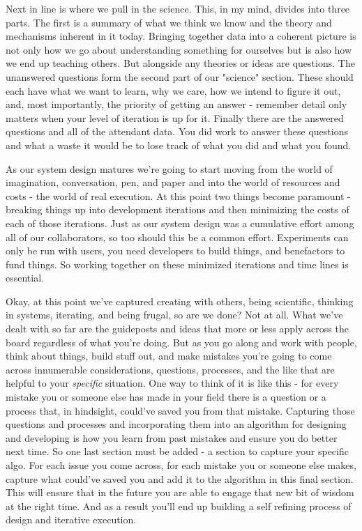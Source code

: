 \documentclass[11pt]{book}
\begin{document}
Next in line is where we pull in the science. This, in my mind, divides into three parts. The first is a summary of what we think we know and the theory and mechanisms inherent in it today. Bringing together data into a coherent picture is not only how we go about understanding something for ourselves but is also how we end up teaching others. But alongside any theories or ideas are questions. The unanswered questions form the second part of our "science" section. These should each have what we want to learn, why we care, how we intend to figure it out, and, most importantly, the priority of getting an answer - remember detail only matters when your level of iteration is up for it. Finally there are the answered questions and all of the attendant data. You did work to answer these questions and what a waste it would be to lose track of what you did and what you found.
\newline

As our system design matures we're going to start moving from the world of imagination, conversation, pen, and paper and into the world of resources and costs - the world of real execution. At this point two things become paramount - breaking things up into development iterations and then minimizing the costs of each of those iterations. Just as our system design was a cumulative effort among all of our collaborators, so too should this be a common effort. Experiments can only be run with users, you need developers to build things, and benefactors to fund things. So working together on these minimized iterations and time lines is essential.
\newline

Okay, at this point we've captured creating with others, being scientific, thinking in systems, iterating, and being frugal, so are we done? Not at all. What we've dealt with so far are the guideposts and ideas that more or less apply across the board regardless of what you're doing. But as you go along and work with people, think about things, build stuff out, and make mistakes you're going to come across innumerable considerations, questions, processes, and the like that are helpful to your \textit{specific} situation. One way to think of it is like this - for every mistake you or someone else has made in your field there is a question or a process that, in hindsight, could've saved you from that mistake. Capturing those questions and processes and incorporating them into an algorithm for designing and developing is how you learn from past mistakes and ensure you do better next time. So one last section must be added - a section to capture your specific algo. For each issue you come across, for each mistake you or someone else makes, capture what could've saved you and add it to the algorithm in this final section. This will ensure that in the future you are able to engage that new bit of wisdom at the right time. And as a result you'll end up building a self refining process of design and iterative execution.
\newline
\end{document}
